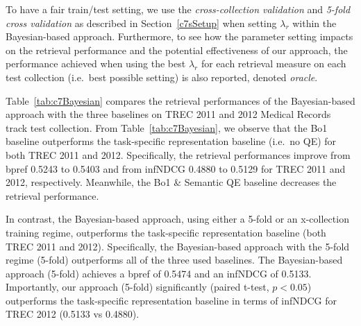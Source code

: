 \documentclass[1p]{elsarticle}
\begin{document}
%
To have a fair train/test setting, we use the \emph{cross-collection validation} and \emph{5-fold cross validation} as described in Section~\ref{c7sSetup} when setting $\lambda_r$ within the Bayesian-based approach. Furthermore, to see how the parameter setting impacts on the retrieval performance and the potential effectiveness of our approach, the performance achieved when using the best $\lambda_r$ for each retrieval measure on each test collection (i.e.\ best possible setting) is also reported, denoted \emph{oracle}.


Table~\ref{tab:c7Bayesian} compares the retrieval performances of the Bayesian-based approach with the three baselines on TREC 2011 and 2012 Medical Records track test collection. From Table~\ref{tab:c7Bayesian}, we observe that the Bo1 baseline outperforms the task-specific representation baseline (i.e.\ no QE) for both TREC 2011 and 2012. Specifically, the retrieval performances improve from bpref 0.5243 to 0.5403 and from infNDCG 0.4880 to 0.5129 for TREC 2011 and 2012, respectively. Meanwhile, the Bo1 \& Semantic QE baseline decreases the retrieval performance. 

In contrast, the Bayesian-based approach, using either a 5-fold or an x-collection training regime, outperforms the task-specific representation baseline (both TREC 2011 and 2012). Specifically, the Bayesian-based approach with the 5-fold regime (5-fold) outperforms all of the three used baselines. The Bayesian-based approach (5-fold) achieves a bpref of 0.5474 and an infNDCG of 0.5133. Importantly, our approach (5-fold) significantly (paired t-test, $p<0.05$) outperforms the task-specific representation baseline in terms of infNDCG for TREC 2012 (0.5133 vs 0.4880). 
\end{document}
